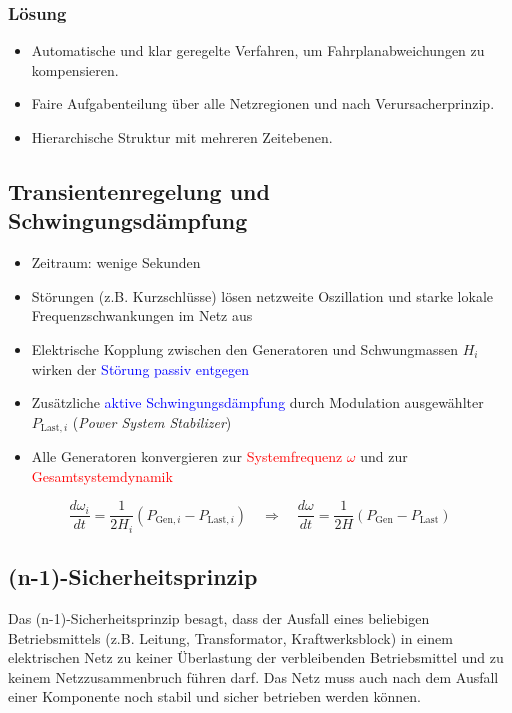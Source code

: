 \subsubsection{Lösung}
    \begin{itemize}
        \item Automatische und klar geregelte Verfahren, um Fahrplanabweichungen zu kompensieren.
        \item Faire Aufgabenteilung über alle Netzregionen und nach Verursacherprinzip.
        \item Hierarchische Struktur mit mehreren Zeitebenen.
    \end{itemize}

\subsection{Transientenregelung und Schwingungsdämpfung}
    \begin{itemize}
        \item Zeitraum: wenige Sekunden
        \item Störungen (z.B. Kurzschlüsse) lösen netzweite Oszillation und starke lokale Frequenzschwankungen im Netz aus
        \item Elektrische Kopplung zwischen den Generatoren und Schwungmassen \( H_i \) wirken der \textcolor{blue}{Störung passiv entgegen}
        \item Zusätzliche \textcolor{blue}{aktive Schwingungsdämpfung} durch Modulation ausgewählter \( P_{\text{Last},i} \) (\textit{Power System Stabilizer})
        \item Alle Generatoren konvergieren zur \textcolor{red}{Systemfrequenz \(\omega\)} und zur \textcolor{red}{Gesamtsystemdynamik}
    \end{itemize}

    $$
    \frac{d\omega_i}{dt} = \frac{1}{2H_i} (P_{\text{Gen},i} - P_{\text{Last},i})
    \quad \Rightarrow \quad
    \frac{d\omega}{dt} = \frac{1}{2H} (P_{\text{Gen}} - P_{\text{Last}})
    $$

\subsection{(n-1)-Sicherheitsprinzip}
    Das (n-1)-Sicherheitsprinzip besagt, dass der Ausfall eines beliebigen Betriebsmittels 
    (z.B. Leitung, Transformator, Kraftwerksblock) in einem elektrischen Netz zu keiner 
    Überlastung der verbleibenden Betriebsmittel und zu keinem Netzzusammenbruch führen darf. 
    Das Netz muss auch nach dem Ausfall einer Komponente noch stabil und sicher betrieben werden können.

